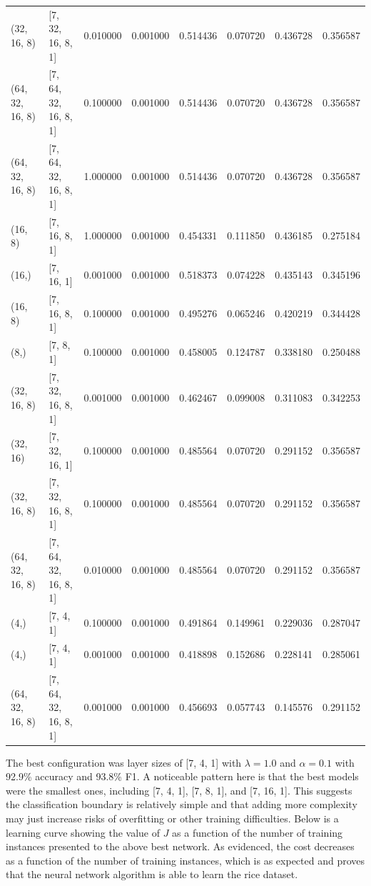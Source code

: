 \documentclass{article}
\begin{document}
\begin{longtable}{llrrrrrr}
(32, 16, 8) & [7, 32, 16, 8, 1] & 0.010000 & 0.001000 & 0.514436 & 0.070720 & 0.436728 & 0.356587 \\
(64, 32, 16, 8) & [7, 64, 32, 16, 8, 1] & 0.100000 & 0.001000 & 0.514436 & 0.070720 & 0.436728 & 0.356587 \\
(64, 32, 16, 8) & [7, 64, 32, 16, 8, 1] & 1.000000 & 0.001000 & 0.514436 & 0.070720 & 0.436728 & 0.356587 \\
(16, 8) & [7, 16, 8, 1] & 1.000000 & 0.001000 & 0.454331 & 0.111850 & 0.436185 & 0.275184 \\
(16,) & [7, 16, 1] & 0.001000 & 0.001000 & 0.518373 & 0.074228 & 0.435143 & 0.345196 \\
(16, 8) & [7, 16, 8, 1] & 0.100000 & 0.001000 & 0.495276 & 0.065246 & 0.420219 & 0.344428 \\
(8,) & [7, 8, 1] & 0.100000 & 0.001000 & 0.458005 & 0.124787 & 0.338180 & 0.250488 \\
(32, 16, 8) & [7, 32, 16, 8, 1] & 0.001000 & 0.001000 & 0.462467 & 0.099008 & 0.311083 & 0.342253 \\
(32, 16) & [7, 32, 16, 1] & 0.100000 & 0.001000 & 0.485564 & 0.070720 & 0.291152 & 0.356587 \\
(32, 16, 8) & [7, 32, 16, 8, 1] & 0.100000 & 0.001000 & 0.485564 & 0.070720 & 0.291152 & 0.356587 \\
(64, 32, 16, 8) & [7, 64, 32, 16, 8, 1] & 0.010000 & 0.001000 & 0.485564 & 0.070720 & 0.291152 & 0.356587 \\
(4,) & [7, 4, 1] & 0.100000 & 0.001000 & 0.491864 & 0.149961 & 0.229036 & 0.287047 \\
(4,) & [7, 4, 1] & 0.001000 & 0.001000 & 0.418898 & 0.152686 & 0.228141 & 0.285061 \\
(64, 32, 16, 8) & [7, 64, 32, 16, 8, 1] & 0.001000 & 0.001000 & 0.456693 & 0.057743 & 0.145576 & 0.291152 \\
\bottomrule
\end{longtable}

The best configuration was layer sizes of [7, 4, 1] with $\lambda = 1.0$ and $\alpha = 0.1$ with 92.9\% accuracy and 93.8\% F1. A noticeable pattern here is that the best models were the smallest ones, including  [7, 4, 1], [7, 8, 1], and [7, 16, 1]. This suggests the classification boundary is relatively simple and that adding more complexity may just increase risks of overfitting or other training difficulties. 
Below is a learning curve showing the value of $J$ as a function of the number of training instances presented to the above best network. As evidenced, the cost decreases as a function of the number of training instances, which is as expected and proves that the neural network algorithm is able to learn the rice dataset.
\end{document}

